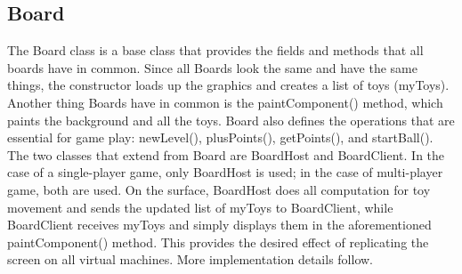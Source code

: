\documentclass[11pt]{article}
\begin{document}
\subsection{Board}
The Board class is a base class that provides the fields and methods that all 
boards have in common.  Since all Boards look the same and have the same 
things, the constructor loads up the graphics and creates a list of toys 
(myToys).  Another thing Boards have in common is the paintComponent() method, 
which paints the background and all the toys.  Board also defines the 
operations that are essential for game play: newLevel(), plusPoints(), 
getPoints(), and startBall(). 
\\
The two classes that extend from Board are BoardHost and BoardClient.  In the 
case of a single-player game, only BoardHost is used; in the case of 
multi-player game, both are used.  On the surface, BoardHost does all 
computation for toy movement and sends the updated list of myToys to 
BoardClient, while BoardClient receives myToys and simply displays them in the 
aforementioned paintComponent() method.  This provides the desired effect of 
replicating the screen on all virtual machines.  More implementation details 
follow.
\end{document}
